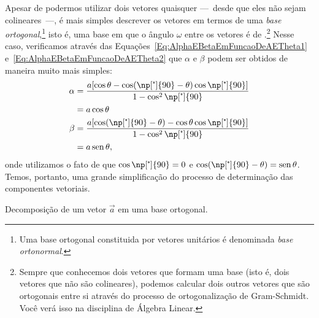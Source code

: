 Apesar de podermos utilizar dois vetores quaisquer ---~desde que eles não sejam colineares~---, é mais simples descrever os vetores em termos de uma \emph{base ortogonal},\footnote[][-5mm]{Uma base ortogonal constituida por vetores unitários é denominada \emph{base ortonormal}.} isto é, uma base em que o ângulo $\omega$ entre os vetores é de .\footnote[][5mm]{Sempre que conhecemos dois vetores que formam uma base (isto é, dois vetores que não são colineares), podemos calcular dois outros vetores que são ortogonais entre si através do processo de ortogonalização de Gram-Schmidt. Você verá isso na disciplina de Álgebra Linear.} Nesse caso, verificamos através das Equações~\eqref{Eq:AlphaEBetaEmFuncaoDeAETheta1} e~\eqref{Eq:AlphaEBetaEmFuncaoDeAETheta2} que $\alpha$ e $\beta$ podem ser obtidos de maneira muito mais simples:
\begin{align}
    \alpha &= \frac{a[\cos\theta - \cos(\np[\tcdegree]{90}-\theta)\cos\np[\tcdegree]{90}]}{1-\cos^2\np[\tcdegree]{90}} \\
    &=a\cos\theta \\
    \beta &= \frac{a[\cos(\np[\tcdegree]{90} - \theta) - \cos\theta\cos\np[\tcdegree]{90}]}{1-\cos^2\np[\tcdegree]{90}} \\
    &= a\sen\theta,
\end{align}
%
onde utilizamos o fato de que $\cos\np[\tcdegree]{90} = 0$ e $\cos(\np[\tcdegree]{90} - \theta) = \sen\theta$. Temos, portanto, uma grande simplificação do processo de determinação das componentes vetoriais.

\begin{marginfigure}[2cm]
\centering
{}
\caption{Decomposição de um vetor $\vec{a}$ em uma base ortogonal. \label{Fig:DecomposicaoEixosOrto}}
\end{marginfigure}

